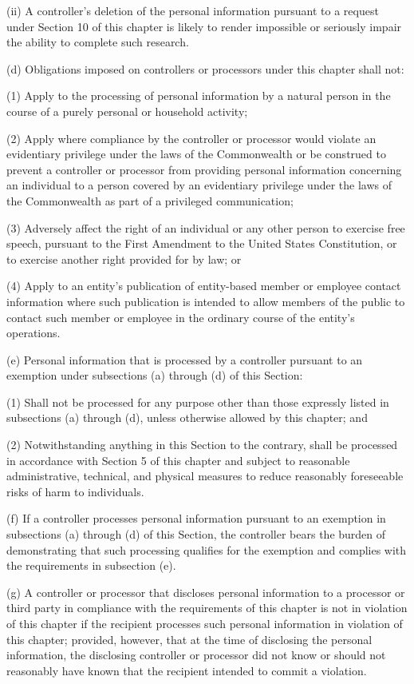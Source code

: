 (ii) A controller’s deletion of the personal information pursuant to a request under Section 10 of this chapter is likely to render impossible or seriously impair the ability to complete such research.

(d) Obligations imposed on controllers or processors under this chapter shall not:

(1) Apply to the processing of personal information by a natural person in the course of a purely personal or household activity; 

(2) Apply where compliance by the controller or processor would violate an evidentiary privilege under the laws of the Commonwealth or be construed to prevent a controller or processor from providing personal information concerning an individual to a person covered by an evidentiary privilege under the laws of the Commonwealth as part of a privileged communication;

(3) Adversely affect the right of an individual or any other person to exercise free speech, pursuant to the First Amendment to the United States Constitution, or to exercise another right provided for by law; or

(4) Apply to an entity’s publication of entity-based member or employee contact information where such publication is intended to allow members of the public to contact such member or employee in the ordinary course of the entity’s operations.

(e) Personal information that is processed by a controller pursuant to an exemption under subsections (a) through (d) of this Section:

(1) Shall not be processed for any purpose other than those expressly listed in subsections (a) through (d), unless otherwise allowed by this chapter; and

(2) Notwithstanding anything in this Section to the contrary, shall be processed in accordance with Section 5 of this chapter and subject to reasonable administrative, technical, and physical measures to reduce reasonably foreseeable risks of harm to individuals.

(f) If a controller processes personal information pursuant to an exemption in subsections (a) through (d) of this Section, the controller bears the burden of demonstrating that such processing qualifies for the exemption and complies with the requirements in subsection (e).

(g) A controller or processor that discloses personal information to a processor or third party in compliance with the requirements of this chapter is not in violation of this chapter if the recipient processes such personal information in violation of this chapter; provided, however, that at the time of disclosing the personal information, the disclosing controller or processor did not know or should not reasonably have known that the recipient intended to commit a violation.

